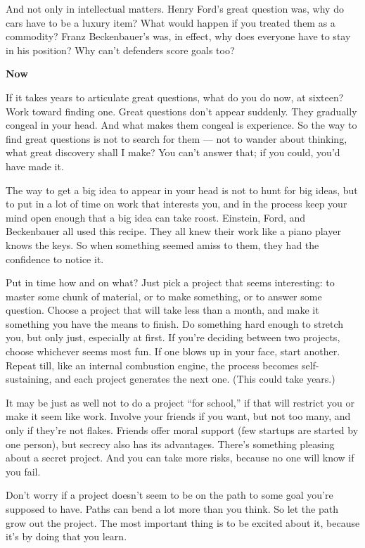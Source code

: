 \documentclass[12pt]{book}
\begin{document}
And not only in intellectual matters. Henry Ford's great question was,
why do cars have to be a luxury item? What would happen if you treated
them as a commodity? Franz Beckenbauer's was, in effect, why does
everyone have to stay in his position? Why can't defenders score goals
too?

\textbf{Now}

If it takes years to articulate great questions, what do you do now, at
sixteen? Work toward finding one. Great questions don't appear suddenly.
They gradually congeal in your head. And what makes them congeal is
experience. So the way to find great questions is not to search for them
--- not to wander about thinking, what great discovery shall I make? You
can't answer that; if you could, you'd have made it.

The way to get a big idea to appear in your head is not to hunt for big
ideas, but to put in a lot of time on work that interests you, and in
the process keep your mind open enough that a big idea can take roost.
Einstein, Ford, and Beckenbauer all used this recipe. They all knew
their work like a piano player knows the keys. So when something seemed
amiss to them, they had the confidence to notice it.

Put in time how and on what? Just pick a project that seems interesting:
to master some chunk of material, or to make something, or to answer
some question. Choose a project that will take less than a month, and
make it something you have the means to finish. Do something hard enough
to stretch you, but only just, especially at first. If you're deciding
between two projects, choose whichever seems most fun. If one blows up
in your face, start another. Repeat till, like an internal combustion
engine, the process becomes self-sustaining, and each project generates
the next one. (This could take years.)

It may be just as well not to do a project ``for school,'' if that will
restrict you or make it seem like work. Involve your friends if you
want, but not too many, and only if they're not flakes. Friends offer
moral support (few startups are started by one person), but secrecy also
has its advantages. There's something pleasing about a secret project.
And you can take more risks, because no one will know if you fail.

Don't worry if a project doesn't seem to be on the path to some goal
you're supposed to have. Paths can bend a lot more than you think. So
let the path grow out the project. The most important thing is to be
excited about it, because it's by doing that you learn.
\end{document}
